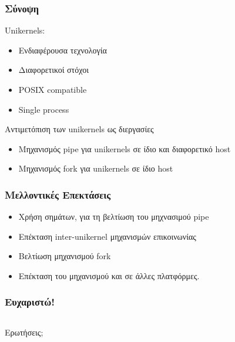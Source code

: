 \documentclass[red,slidestop,notes,compress,mathserif]{beamer}
\begin{document}
\begin{frame}
\frametitle{Σύνοψη}
Unikernels:
\begin{itemize}
\item Ενδιαφέρουσα τεχνολογία
\item Διαφορετικοί στόχοι 
\item POSIX compatible
\item Single process
\end{itemize}
\begin{block}{Αντιμετόπιση των unikernels ως διεργασίες}
\begin{itemize}
\item Μηχανισμός pipe για unikernels σε ίδιο και διαφορετικό host
\item Μηχανισμός fork για unikernels σε ίδιο host
\end{itemize}
\end{block}
\end{frame}

\begin{frame}
\frametitle{Μελλοντικές Επεκτάσεις}
\begin{itemize}
\item Χρήση σημάτων, για τη βελτίωση του μηχνασιμού pipe
\item Επέκταση inter-unikernel μηχανισμών επικοινωνίας 
\item Βελτίωση μηχανισμού fork
\item Επέκταση του μηχανισμού και σε άλλες πλατφόρμες.
\end{itemize}

\end{frame}
%
\begin{frame}
\frametitle{Ευχαριστώ!}
                \vfill%
\begin{columns}
        \begin{center}
        \begin{center}
                        {\LARGE Ερωτήσεις;}
        \end{center}
                \vfill%
        \end{center}
\end{columns}
                \vfill%
\end{frame}
\end{document}
